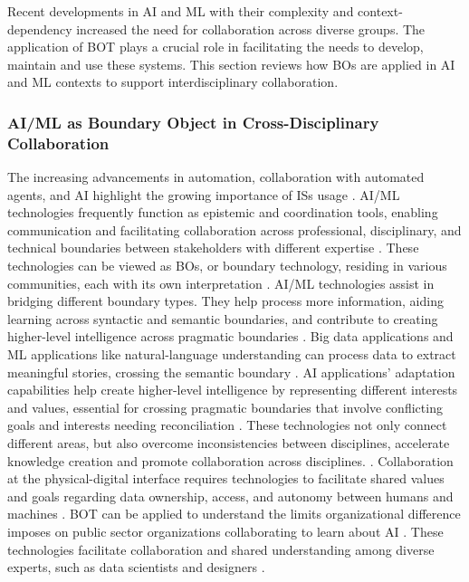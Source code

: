 \documentclass[12pt,oneside]{article}
\begin{document}
Recent developments in \ac{AI} and \ac{ML} with their complexity and context-dependency increased the need for collaboration across diverse groups. The application of \ac{BOT} plays a crucial role in facilitating the needs to develop, maintain and use these systems. This section reviews how \ac{BO}s are applied in \ac{AI} and \ac{ML} contexts to support interdisciplinary collaboration. 

\subsubsection{AI/ML as Boundary Object in Cross-Disciplinary Collaboration} \label{ai-ml-as-boundary-objects-in-cross-disciplinary-collaboration}

The increasing advancements in automation, collaboration with automated agents, and \ac{AI} highlight the growing importance of \ac{IS}s usage \citep[3]{alter2021new}. \ac{AI}/\ac{ML} technologies frequently function as epistemic and coordination tools, enabling communication and facilitating collaboration across professional, disciplinary, and technical boundaries between stakeholders with different expertise \citep[2]{krafft2020challenges}. These technologies can be viewed as \ac{BO}s, or boundary technology, residing in various communities, each with its own interpretation \citep[1-2]{krafft2020challenges}. \ac{AI}/\ac{ML} technologies assist in bridging different boundary types. They help process more information, aiding learning across syntactic and semantic boundaries, and contribute to creating higher-level intelligence across pragmatic boundaries \citep[1]{krafft2020challenges}. \newline
Big data applications and \ac{ML} applications like natural-language understanding can process data to extract meaningful stories, crossing the semantic boundary \citep[2-3]{krafft2020challenges}. \ac{AI} applications' adaptation capabilities help create higher-level intelligence by representing different interests and values, essential for crossing pragmatic boundaries that involve conflicting goals and interests needing reconciliation \citep[2-3]{krafft2020challenges}. These technologies not only connect different areas, but also overcome inconsistencies between disciplines, accelerate knowledge creation and promote collaboration across disciplines. \citep[2]{krafft2020challenges}. Collaboration at the physical-digital interface requires technologies to facilitate shared values and goals regarding data ownership, access, and autonomy between humans and machines \citep[4]{krafft2020challenges}. \ac{BOT} can be applied to understand the limits organizational difference imposes on public sector organizations collaborating to learn about \ac{AI} \citep[1939]{wilson2023learning}. These technologies facilitate collaboration and shared understanding among diverse experts, such as data scientists and designers \citep[8-9]{yang2018investigating}.  \newline
\end{document}
